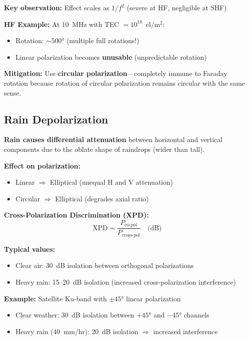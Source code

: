 \textbf{Key observation:} Effect scales as $1/f^2$ (severe at HF, negligible at SHF)

\begin{warningbox}
\textbf{HF Example:} At 10~MHz with TEC $= 10^{18}$~el/m$^2$:
\begin{itemize}
\item Rotation: $\sim 500°$ (multiple full rotations!)
\item Linear polarization becomes \textbf{unusable} (unpredictable rotation)
\end{itemize}
\end{warningbox}

\textbf{Mitigation:} Use \textbf{circular polarization}---completely immune to Faraday rotation because rotation of circular polarization remains circular with the same sense.

\subsection{Rain Depolarization}

\textbf{Rain causes differential attenuation} between horizontal and vertical components due to the oblate shape of raindrops (wider than tall).

\textbf{Effect on polarization:}
\begin{itemize}
\item Linear $\Rightarrow$ Elliptical (unequal H and V attenuation)
\item Circular $\Rightarrow$ Elliptical (degrades axial ratio)
\end{itemize}

\textbf{Cross-Polarization Discrimination (XPD):}
\begin{equation}
\mathrm{XPD} = \frac{P_{\text{co-pol}}}{P_{\text{cross-pol}}} \quad \text{(dB)}
\label{eq:xpd}
\end{equation}

\textbf{Typical values:}
\begin{itemize}
\item Clear air: 30~dB isolation between orthogonal polarizations
\item Heavy rain: 15--20~dB isolation (increased cross-polarization interference)
\end{itemize}

\textbf{Example:} Satellite Ku-band with $\pm 45°$ linear polarization
\begin{itemize}
\item Clear weather: 30~dB isolation between $+45°$ and $-45°$ channels
\item Heavy rain (40~mm/hr): 20~dB isolation $\Rightarrow$ increased interference
\end{itemize}

